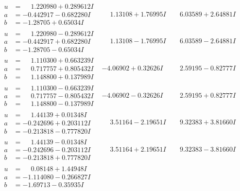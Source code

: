 \documentclass[1p]{elsarticle_modified}
\theoremstyle{definition}
\begin{document}
$$\begin{array}{c|c|c}
\begin{aligned}
u &= \phantom{-}1.220980 + 0.289612 I \\
a &= -0.442917 - 0.682280 I \\
b &= -1.28705 + 0.65034 I\end{aligned}
 & \phantom{-}1.13108 + 1.76995 I & \phantom{-}6.03589 + 2.64881 I \\ \hline\begin{aligned}
u &= \phantom{-}1.220980 - 0.289612 I \\
a &= -0.442917 + 0.682280 I \\
b &= -1.28705 - 0.65034 I\end{aligned}
 & \phantom{-}1.13108 - 1.76995 I & \phantom{-}6.03589 - 2.64881 I \\ \hline\begin{aligned}
u &= \phantom{-}1.110300 + 0.663239 I \\
a &= \phantom{-}0.717757 + 0.805432 I \\
b &= \phantom{-}1.148800 + 0.137989 I\end{aligned}
 & -4.06902 + 0.32626 I & \phantom{-}2.59195 - 0.82777 I \\ \hline\begin{aligned}
u &= \phantom{-}1.110300 - 0.663239 I \\
a &= \phantom{-}0.717757 - 0.805432 I \\
b &= \phantom{-}1.148800 - 0.137989 I\end{aligned}
 & -4.06902 - 0.32626 I & \phantom{-}2.59195 + 0.82777 I \\ \hline\begin{aligned}
u &= \phantom{-}1.44139 + 0.01348 I \\
a &= -0.242696 + 0.203112 I \\
b &= -0.213818 - 0.777820 I\end{aligned}
 & \phantom{-}3.51164 - 2.19651 I & \phantom{-}9.32383 + 3.81660 I \\ \hline\begin{aligned}
u &= \phantom{-}1.44139 - 0.01348 I \\
a &= -0.242696 - 0.203112 I \\
b &= -0.213818 + 0.777820 I\end{aligned}
 & \phantom{-}3.51164 + 2.19651 I & \phantom{-}9.32383 - 3.81660 I \\ \hline\begin{aligned}
u &= \phantom{-}0.08148 + 1.44948 I \\
a &= -1.114080 - 0.266827 I \\
b &= -1.69713 - 0.35935 I\end{aligned}

\end{array}$$
\end{document}
